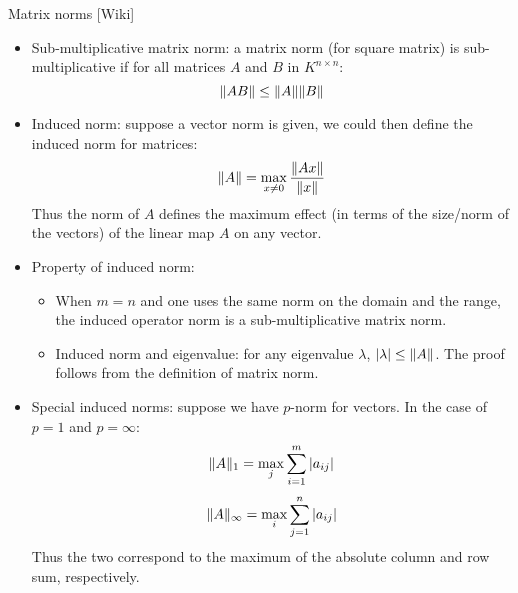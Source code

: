 \documentclass{report}
\begin{document}
Matrix norms [Wiki]
\begin{itemize}
\item Sub-multiplicative matrix norm: a matrix norm (for square matrix) is sub-multiplicative if for all matrices $A$ and $B$ in $K^{n \times n}$: 
\begin{equation}
\lVert AB\rVert \leq \lVert A\rVert \lVert B\rVert	
\end{equation}

\item Induced norm: suppose a vector norm is given, we could then define the induced norm for matrices: 
\begin{equation}
\lVert A\rVert = \max_{x \neq 0} \frac{\lVert Ax\rVert}{\lVert x\rVert}	
\end{equation}
Thus the norm of $A$ defines the maximum effect (in terms of the size/norm of the vectors) of the linear map $A$ on any vector. 

\item Property of induced norm: 
\begin{itemize}
\item When $m = n$ and one uses the same norm on the domain and the range, the induced operator norm is a sub-multiplicative matrix norm. 
\item Induced norm and eigenvalue: for any eigenvalue $\lambda$, $|\lambda| \leq \lVert A\rVert$. The proof follows from the definition of matrix norm. 
\end{itemize}

\item Special induced norms: suppose we have $p$-norm for vectors. In the case of $p = 1$ and $p = \infty$: 
\begin{equation}
\lVert A\rVert_1 = \max_{j} \sum_{i=1}^m |a_{ij}|	
\end{equation}
\begin{equation}
\lVert A\rVert_{\infty} = \max_{i} \sum_{j=1}^n |a_{ij}|	
\end{equation}
Thus the two correspond to the maximum of the absolute column and row sum, respectively. 

\end{itemize}
 
\end{document}
